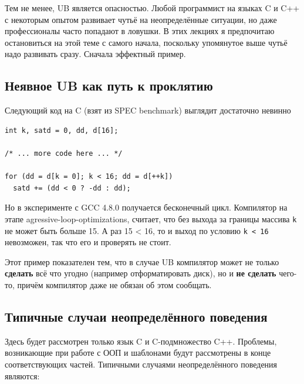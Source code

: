 \documentclass[a4paper,12pt,oneside]{book}
\begin{document}
Тем не менее, UB является опасностью. Любой программист на языках C и C++ с некоторым опытом развивает чутьё на неопределённые ситуации, но даже профессионалы часто попадают в ловушки. В этих лекциях я предпочитаю остановиться на этой теме с самого начала, поскольку упомянутое выше чутьё надо развивать сразу. Сначала эффектный пример.

\subsection{Неявное UB как путь к проклятию}\label{HiddenUB}

Следующий код на C (взят из SPEC benchmark) выглядит достаточно невинно

\begin{lstlisting}
int k, satd = 0, dd, d[16];

/* ... more code here ... */

for (dd = d[k = 0]; k < 16; dd = d[++k])
  satd += (dd < 0 ? -dd : dd);
\end{lstlisting}

Но в эксперименте с GCC 4.8.0 получается бесконечный цикл. Компилятор на этапе agressive-loop-optimizations, считает, что без выхода за границы массива \lstinline!k! не может быть больше 15. А раз 15 < 16, то и выход по условию \lstinline!k < 16! невозможен, так что его и проверять не стоит.

Этот пример показателен тем, что в случае UB компилятор может не только \textbf{сделать} всё что угодно (например отформатировать диск), но и \textbf{не сделать} чего-то, причём компилятор даже не обязан об этом сообщать.

\subsection{Типичные случаи неопределённого поведения}\label{TypicalUB}

Здесь будет рассмотрен только язык C и C-подмножество C++. Проблемы, возникающие при работе с ООП и шаблонами будут рассмотрены в конце соответствующих частей. Типичными случаями неопределённого поведения являются:
\end{document}
